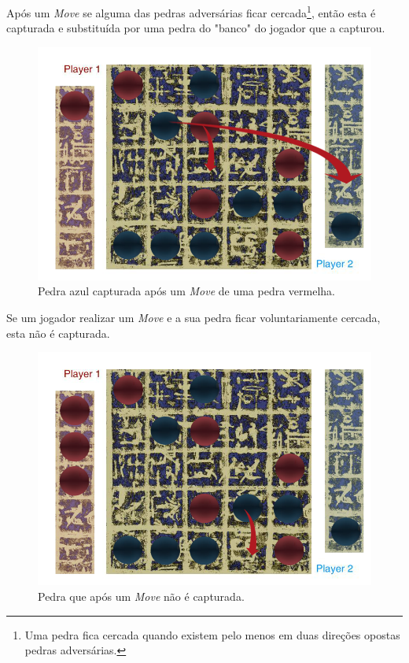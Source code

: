 \documentclass[a4paper]{article}
\begin{document}
Após um \textit{Move} se alguma das pedras adversárias ficar cercada\footnote{Uma pedra fica cercada quando existem pelo menos em duas direções opostas pedras adversárias.}, então esta é capturada e substituída por uma pedra do "banco" do jogador que a capturou.

\begin{figure}[!htb]
	\centering
	\includegraphics[scale=0.3]{images/move_cap.png} 
	\caption{Pedra azul capturada após um \textit{Move} de uma pedra vermelha.}
\end{figure}

Se um jogador realizar um \textit{Move} e a sua pedra ficar voluntariamente cercada, esta não é capturada.

\begin{figure}[!htb]
	\centering
	\includegraphics[scale=0.3]{images/move_no_cap.png} 
	\caption{Pedra que após um \textit{Move} não é capturada.}
\end{figure}
\end{document}
